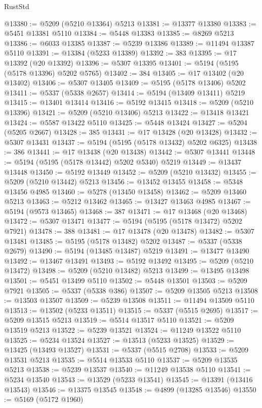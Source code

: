 \begin{lexlean}{RustStd}
\begin{coremodule}
@13380 := @5209 (@5210 @13364) @5213
@13381 := @13377 @13380
@13383 := @5451 @13381 @5110
@13384 := @5448 @13383
@13385 := @8269 @5213
@13386 := @6033 @13385
@13387 := @5239 @13386
@13389 := @11494 @13387 @5110
@13391 := @13384 (@5233 @13389)
@13392 := 383
@13395 := @17 @13392 (@20 @13392)
@13396 := @5307 @13395
@13401 := @5194 (@5195 (@5178 @13396) @5202 @5765)
@13402 := 384
@13405 := @17 @13402 (@20 @13402)
@13406 := @5307 @13405
@13409 := @5195 (@5178 @13406) @5202
@13411 := @5337 (@5338 @2657)
@13414 := @5194 (@13409 @13411) @5219
@13415 := @13401 @13414
@13416 := @5192 @13415
@13418 := @5209 (@5210 @13396)
@13421 := @5209 (@5210 @13406) @5213
@13422 := @13418 @13421
@13424 := @5587 @13422 @5110
@13425 := @5448 @13424
@13427 := @5204 (@5205 @2667)
@13428 := 385
@13431 := @17 @13428 (@20 @13428)
@13432 := @5307 @13431
@13437 := @5194 (@5195 (@5178 @13432) @5202 @6325)
@13438 := 386
@13441 := @17 @13438 (@20 @13438)
@13442 := @5307 @13441
@13448 := @5194 (@5195 (@5178 @13442) @5202 @5340) @5219
@13449 := @13437 @13448
@13450 := @5192 @13449
@13452 := @5209 (@5210 @13432)
@13455 := @5209 (@5210 @13442) @5213
@13456 := @13452 @13455
@13458 := @5348 @13456 @4985
@13460 := @5278 (@13450 @13458)
@13462 := @5209 @13460 @5213
@13463 := @5212 @13462
@13465 := @13427 @13463 @4985
@13467 := @5194 (@9573 @13465)
@13468 := 387
@13471 := @17 @13468 (@20 @13468)
@13472 := @5307 @13471
@13477 := @5194 (@5195 (@5178 @13472) @5202 @7921)
@13478 := 388
@13481 := @17 @13478 (@20 @13478)
@13482 := @5307 @13481
@13485 := @5195 (@5178 @13482) @5202
@13487 := @5337 (@5338 @2679)
@13490 := @5194 (@13485 @13487) @5219
@13491 := @13477 @13490
@13492 := @13467 @13491
@13493 := @5192 @13492
@13495 := @5209 (@5210 @13472)
@13498 := @5209 (@5210 @13482) @5213
@13499 := @13495 @13498
@13501 := @5451 @13499 @5110
@13502 := @5448 @13501
@13503 := @5209 @7921
@13505 := @5337 (@5338 @386)
@13507 := @5209 @13505 @5213
@13508 := @13503 @13507
@13509 := @5239 @13508
@13511 := @11494 @13509 @5110
@13513 := @13502 (@5233 @13511)
@13515 := @5337 (@5515 @2695)
@13517 := @5209 @13515 @5213
@13519 := @5514 @13517 @5110
@13521 := @5209 @13519 @5213
@13522 := @5239 @13521
@13524 := @11249 @13522 @5110
@13525 := @5234 @13524
@13527 := @13513 (@5233 @13525)
@13529 := @13425 (@13493 @13527)
@13531 := @5337 (@5515 @2708)
@13533 := @5209 @13531 @5213
@13535 := @5514 @13533 @5110
@13537 := @5209 @13535 @5213
@13538 := @5239 @13537
@13540 := @11249 @13538 @5110
@13541 := @5234 @13540
@13543 := @13529 (@5233 @13541)
@13545 := @13391 (@13416 @13543)
@13546 := @13375 @13545
@13548 := @4899 (@13285 @13546)
@13550 := @5169 (@5172 @1960)

\end{coremodule}
\end{lexlean}
